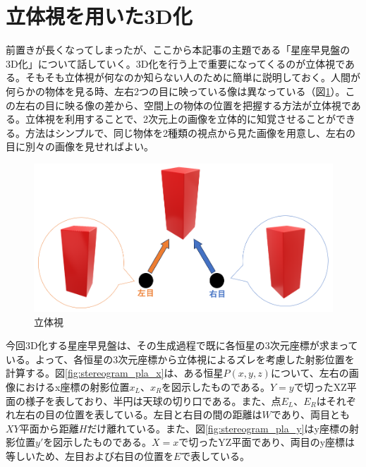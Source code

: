 \documentclass[../main]{subfiles}
\begin{document}
\section{立体視を用いた3D化}
前置きが長くなってしまったが、ここから本記事の主題である「星座早見盤の3D化」について話していく。3D化を行う上で重要になってくるのが立体視である。そもそも立体視が何なのか知らない人のために簡単に説明しておく。人間が何らかの物体を見る時、左右2つの目に映っている像は異なっている（図\ref{fig:stereogram_explain}）。この左右の目に映る像の差から、空間上の物体の位置を把握する方法が立体視である。立体視を利用することで、2次元上の画像を立体的に知覚させることができる。方法はシンプルで、同じ物体を2種類の視点から見た画像を用意し、左右の目に別々の画像を見せればよい。

\begin{figure}[H]
  \centering
  \includegraphics[width=12cm]{sections/Fujisawa/image/stereogram_guidance.PNG}
  \caption{立体視}
  \label{fig:stereogram_explain}
\end{figure}

今回3D化する星座早見盤は、その生成過程で既に各恒星の3次元座標が求まっている。よって、各恒星の3次元座標から立体視によるズレを考慮した射影位置を計算する。図\ref{fig:stereogram_pla_x}は、ある恒星$P(x, y, z)$について、左右の画像におけるx座標の射影位置$x_L$、$x_R$を図示したものである。$Y=y$で切ったXZ平面の様子を表しており、半円は天球の切り口である。また、点$E_L$、$E_R$はそれぞれ左右の目の位置を表している。左目と右目の間の距離は$W$であり、両目とも$XY$平面から距離$H$だけ離れている。また、図\ref{fig:stereogram_pla_y}はy座標の射影位置$y'$を図示したものである。$X=x$で切ったYZ平面であり、両目のy座標は等しいため、左目および右目の位置を$E$で表している。
\end{document}
